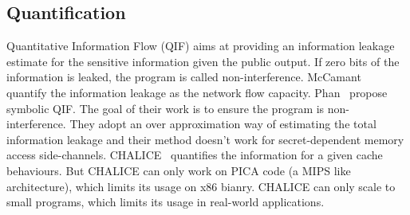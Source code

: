 \subsection{Quantification}
Quantitative Information Flow (QIF) aims at providing an information leakage estimate for the
sensitive information given the public output. If zero bits of the information is leaked, the 
program is called non-interference. McCamant~\cite{McCamantE2008} quantify the information leakage
as the network flow capacity. Phan~\cite{Phan:2012:SQI:2382756.2382791} propose symbolic QIF. The
goal of their work is to ensure the program is non-interference. They adopt an over
approximation way of estimating the total information leakage and their method doesn't work for
secret-dependent memory access side-channels. CHALICE~\cite{Chattopadhyay:2017:QIL:3127041.3127044}
quantifies the information for a given cache behaviours. But CHALICE can only 
work on PICA code (a MIPS like architecture), which limits its usage on x86 bianry. 
CHALICE can only scale to small programs, which limits its usage in
real-world applications.
